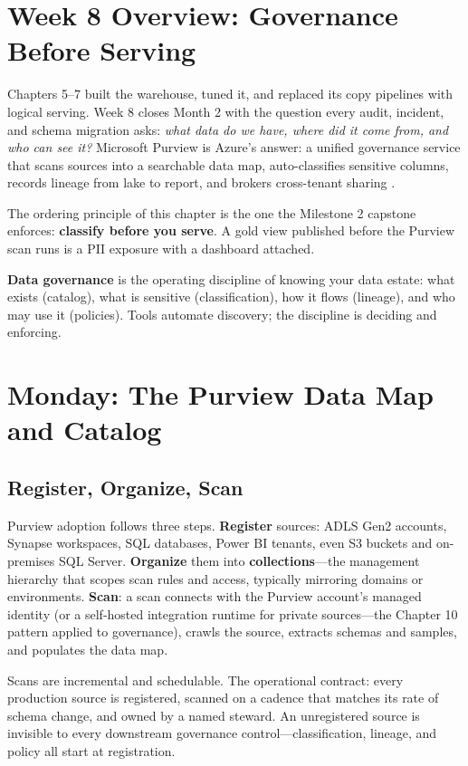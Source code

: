 \section{Week 8 Overview: Governance Before Serving}
Chapters 5--7 built the warehouse, tuned it, and replaced its copy pipelines with logical serving. Week 8 closes Month 2 with the question every audit, incident, and schema migration asks: \emph{what data do we have, where did it come from, and who can see it?} Microsoft Purview is Azure's answer: a unified governance service that scans sources into a searchable data map, auto-classifies sensitive columns, records lineage from lake to report, and brokers cross-tenant sharing \cite{microsoft2025purview}.

The ordering principle of this chapter is the one the Milestone 2 capstone enforces: \textbf{classify before you serve}. A gold view published before the Purview scan runs is a PII exposure with a dashboard attached.

\begin{definitionbox}
\textbf{Data governance} is the operating discipline of knowing your data estate: what exists (catalog), what is sensitive (classification), how it flows (lineage), and who may use it (policies). Tools automate discovery; the discipline is deciding and enforcing.
\end{definitionbox}

\section{Monday: The Purview Data Map and Catalog}

\subsection{Register, Organize, Scan}
Purview adoption follows three steps. \textbf{Register} sources: ADLS Gen2 accounts, Synapse workspaces, SQL databases, Power BI tenants, even S3 buckets and on-premises SQL Server. \textbf{Organize} them into \textbf{collections}---the management hierarchy that scopes scan rules and access, typically mirroring domains or environments. \textbf{Scan}: a scan connects with the Purview account's managed identity (or a self-hosted integration runtime for private sources---the Chapter 10 pattern applied to governance), crawls the source, extracts schemas and samples, and populates the data map.

Scans are incremental and schedulable. The operational contract: every production source is registered, scanned on a cadence that matches its rate of schema change, and owned by a named steward. An unregistered source is invisible to every downstream governance control---classification, lineage, and policy all start at registration.

